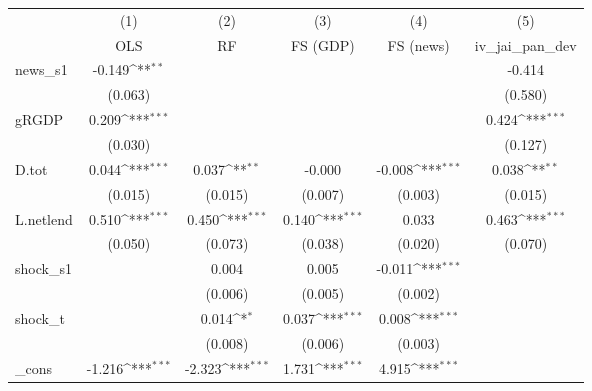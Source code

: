 {
\def\sym#1{\ifmmode^{#1}\else\(^{#1}\)\fi}
\begin{tabular}{l*{5}{c}}
\toprule
            &\multicolumn{1}{c}{(1)}&\multicolumn{1}{c}{(2)}&\multicolumn{1}{c}{(3)}&\multicolumn{1}{c}{(4)}&\multicolumn{1}{c}{(5)}\\
            &\multicolumn{1}{c}{OLS}&\multicolumn{1}{c}{RF}&\multicolumn{1}{c}{FS (GDP)}&\multicolumn{1}{c}{FS (news)}&\multicolumn{1}{c}{iv\_jai\_pan\_dev}\\
\midrule
news\_s1     &      -0.149\sym{**} &                     &                     &                     &      -0.414         \\
            &     (0.063)         &                     &                     &                     &     (0.580)         \\
\addlinespace
gRGDP       &       0.209\sym{***}&                     &                     &                     &       0.424\sym{***}\\
            &     (0.030)         &                     &                     &                     &     (0.127)         \\
\addlinespace
D.tot       &       0.044\sym{***}&       0.037\sym{**} &      -0.000         &      -0.008\sym{***}&       0.038\sym{**} \\
            &     (0.015)         &     (0.015)         &     (0.007)         &     (0.003)         &     (0.015)         \\
\addlinespace
L.netlend   &       0.510\sym{***}&       0.450\sym{***}&       0.140\sym{***}&       0.033         &       0.463\sym{***}\\
            &     (0.050)         &     (0.073)         &     (0.038)         &     (0.020)         &     (0.070)         \\
\addlinespace
shock\_s1    &                     &       0.004         &       0.005         &      -0.011\sym{***}&                     \\
            &                     &     (0.006)         &     (0.005)         &     (0.002)         &                     \\
\addlinespace
shock\_t     &                     &       0.014\sym{*}  &       0.037\sym{***}&       0.008\sym{***}&                     \\
            &                     &     (0.008)         &     (0.006)         &     (0.003)         &                     \\
\addlinespace
\_cons      &      -1.216\sym{***}&      -2.323\sym{***}&       1.731\sym{***}&       4.915\sym{***}&                     \\

\end{tabular}}
